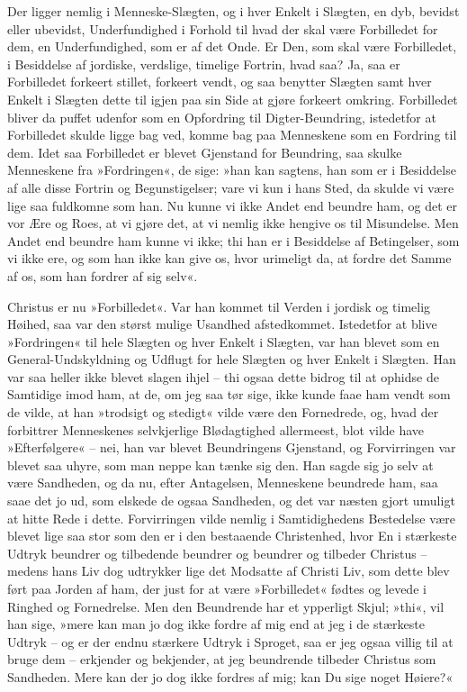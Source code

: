 \documentclass[12pt,a4paper]{article}
\begin{document}
Der ligger nemlig i Menneske-Slægten, og i hver Enkelt i Slægten, en dyb, bevidst eller ubevidst, Underfundighed i Forhold til hvad der skal være Forbilledet for dem, en Underfundighed, som er af det Onde. Er Den, som skal være Forbilledet, i Besiddelse af jordiske, verdslige, timelige Fortrin, hvad saa? Ja, saa er Forbilledet forkeert stillet, forkeert vendt, og saa benytter Slægten samt hver Enkelt i Slægten dette til igjen paa sin Side at gjøre forkeert omkring. Forbilledet bliver da puffet udenfor som en Opfordring til Digter-Beundring, istedetfor at Forbilledet skulde ligge bag ved, komme bag paa Menneskene som en Fordring til dem. Idet saa Forbilledet er blevet Gjenstand for Beundring, saa skulke Menneskene fra »Fordringen«, de sige: »han kan sagtens, han som er i Besiddelse af alle disse Fortrin og Begunstigelser; vare vi kun i hans Sted, da skulde vi være lige saa fuldkomne som han. Nu kunne vi ikke Andet end beundre ham, og det er vor Ære og Roes, at vi gjøre det, at vi nemlig ikke hengive os til Misundelse. Men Andet end beundre ham kunne vi ikke; thi han er i Besiddelse af Betingelser, som vi ikke ere, og som han ikke kan give os, hvor urimeligt da, at fordre det Samme af os, som han fordrer af sig selv«.

Christus er nu »Forbilledet«. Var han kommet til Verden i jordisk og timelig Høihed, saa var den størst mulige Usandhed afstedkommet. Istedetfor at blive »Fordringen« til hele Slægten og hver Enkelt i Slægten, var han blevet som en General-Undskyldning og Udflugt for hele Slægten og hver Enkelt i Slægten. Han var saa heller ikke blevet slagen ihjel – thi ogsaa dette bidrog til at ophidse de Samtidige imod ham, at de, om jeg saa tør sige, ikke kunde faae ham vendt som de vilde, at han »trodsigt og stedigt« vilde være den Fornedrede, og, hvad der forbittrer Menneskenes selvkjerlige Blødagtighed allermeest, blot vilde have »Efterfølgere« – nei, han var blevet Beundringens Gjenstand, og Forvirringen var blevet saa uhyre, som man neppe kan tænke sig den. Han sagde sig jo selv at være Sandheden, og da nu, efter Antagelsen, Menneskene beundrede ham, saa saae det jo ud, som elskede de ogsaa Sandheden, og det var næsten gjort umuligt at hitte Rede i dette. Forvirringen vilde nemlig i Samtidighedens Bestedelse være blevet lige saa stor som den er i den bestaaende Christenhed, hvor En i stærkeste Udtryk beundrer og tilbedende beundrer og beundrer og tilbeder Christus – medens hans Liv dog udtrykker lige det Modsatte af Christi Liv, som dette blev ført paa Jorden af ham, der just for at være »Forbilledet« fødtes og levede i Ringhed og Fornedrelse. Men den Beundrende har et ypperligt Skjul; »thi«, vil han sige, »mere kan man jo dog ikke fordre af mig end at jeg i de stærkeste Udtryk – og er der endnu stærkere Udtryk i Sproget, saa er jeg ogsaa villig til at bruge dem – erkjender og bekjender, at jeg beundrende tilbeder Christus som Sandheden. Mere kan der jo dog ikke fordres af mig; kan Du sige noget Høiere?«
\end{document}

